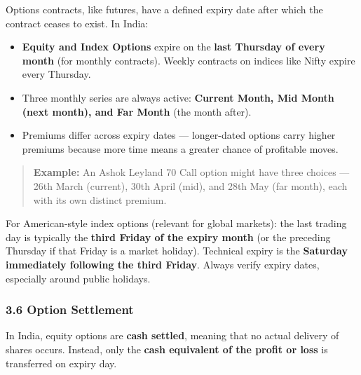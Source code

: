 \documentclass[12pt,openany]{book}
\begin{document}
Options contracts, like futures, have a defined expiry date after which the contract ceases to exist. In India:

\begin{itemize}[leftmargin=*]
    \item \textbf{Equity and Index Options} expire on the \textbf{last Thursday of every month} (for monthly contracts). Weekly contracts on indices like Nifty expire every Thursday.
    \item Three monthly series are always active: \textbf{Current Month, Mid Month (next month), and Far Month} (the month after).
    \item Premiums differ across expiry dates — longer-dated options carry higher premiums because more time means a greater chance of profitable moves.
\end{itemize}

\begin{quote}
\textbf{Example:} An Ashok Leyland 70 Call option might have three choices — 26th March (current), 30th April (mid), and 28th May (far month), each with its own distinct premium.
\end{quote}

For American-style index options (relevant for global markets): the last trading day is typically the \textbf{third Friday of the expiry month} (or the preceding Thursday if that Friday is a market holiday). Technical expiry is the \textbf{Saturday immediately following the third Friday}. Always verify expiry dates, especially around public holidays.

\subsubsection{3.6 Option Settlement}

In India, equity options are \textbf{cash settled}, meaning that no actual delivery of shares occurs. Instead, only the \textbf{cash equivalent of the profit or loss} is transferred on expiry day.
\end{document}
